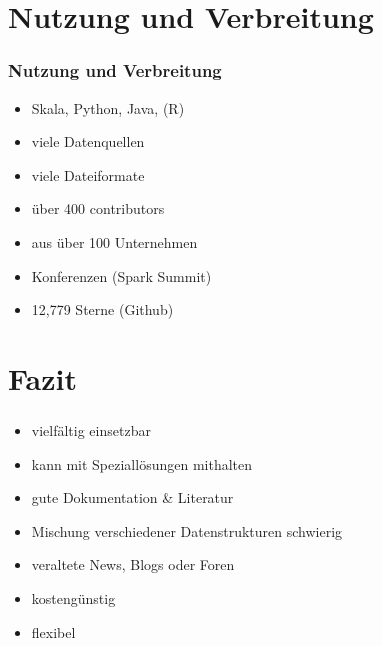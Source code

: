 \documentclass[hyperref={pdfpagelabels=false}]{beamer}
\begin{document}
\section{Nutzung und Verbreitung}
\begin{frame} 
\frametitle{Nutzung und Verbreitung}

\begin{itemize}
	\item Skala, Python, Java, (R)
	\item viele Datenquellen
	\item viele Dateiformate	
	\item über 400 contributors
	\item aus über 100 Unternehmen
	\item Konferenzen (Spark Summit)
	\item 12,779 Sterne (Github)
\end{itemize}

\begin{figure}[h]
  \centering
\end{figure}

\end{frame}


\section{ Fazit}
\begin{frame} 
\frametitle{}

\begin{itemize}
	\item vielfältig einsetzbar
	\item kann mit Speziallösungen mithalten
	\item gute Dokumentation \& Literatur
	\item Mischung verschiedener Datenstrukturen schwierig
	\item veraltete News, Blogs oder Foren
	\item kostengünstig
	\item flexibel
\end{itemize}

\end{frame}
\end{document}
